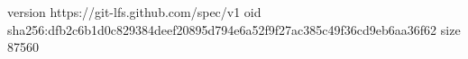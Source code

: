 version https://git-lfs.github.com/spec/v1
oid sha256:dfb2c6b1d0c829384deef20895d794e6a52f9f27ac385c49f36cd9eb6aa36f62
size 87560
